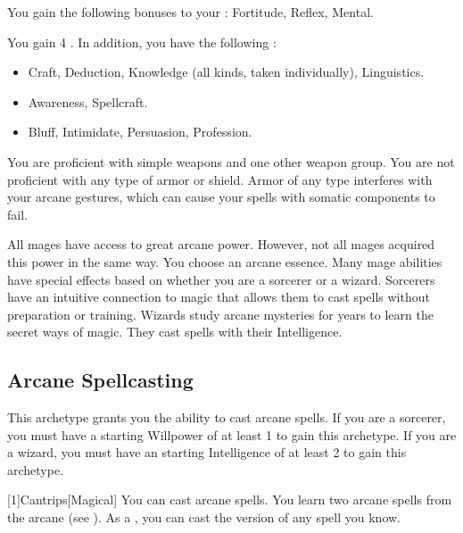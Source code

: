         You gain the following bonuses to your :  Fortitude,  Reflex,  Mental.

        You gain 4 .
        In addition, you have the following :
        \begin{itemize}
            \item {} Craft, Deduction, Knowledge (all kinds, taken individually), Linguistics.
            \item {} Awareness, Spellcraft.
            \item {} Bluff, Intimidate, Persuasion, Profession.
        \end{itemize}

        You are proficient with simple weapons and one other weapon group.
        You are not proficient with any type of armor or shield.
        Armor of any type interferes with your arcane gestures, which can cause your spells with somatic components to fail.

        All mages have access to great arcane power.
        However, not all mages acquired this power in the same way.
        You choose an arcane essence.
        Many mage abilities have special effects based on whether you are a sorcerer or a wizard.
         Sorcerers have an intuitive connection to magic that allows them to cast spells without preparation or training.
         Wizards study arcane mysteries for years to learn the secret ways of magic.
        They cast spells with their Intelligence.

    \subsection{Arcane Spellcasting}
        This archetype grants you the ability to cast arcane spells.
        If you are a sorcerer, you must have a starting Willpower of at least 1 to gain this archetype.
        If you are a wizard, you must have an starting Intelligence of at least 2 to gain this archetype.

        [1]{Cantrips}[Magical]
        You can cast arcane spells.
        You learn two arcane spells from the arcane  (see ).
        As a , you can cast the  version of any spell you know.

